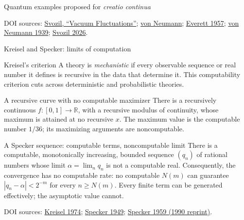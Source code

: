 \documentclass{beamer}
\newcommand{\doiref}[2]{%
  \href{https://doi.org/#1}{\textcolor{blue!65!black}{#2}}}
\newcommand{\sourcefoot}[1]{%
  \par\vfill{\tiny\color{black!60}DOI sources: #1\par}}
\begin{document}
\begin{frame}[shrink=3]{Quantum examples proposed for \emph{creatio continua}}
\sourcefoot{\doiref{10.1007/978-3-319-70815-7_14}{Svozil, ``Vacuum Fluctuations''};
\doiref{10.1007/978-3-642-61409-5}{von Neumann};
\doiref{10.1103/RevModPhys.29.454}{Everett 1957};
\href{http://www.numdam.org/item/CM_1939__6__1_0/}{\textcolor{blue!65!black}{von Neumann 1939}};
\doiref{10.1007/s10701-025-00903-9}{Svozil 2026}.}
\end{frame}


\begin{frame}{Kreisel and Specker: limits of computation}
\footnotesize
\begin{block}{Kreisel's criterion}
A theory is \emph{mechanistic} if every observable sequence or real number
it defines is recursive in the data that determine it. This computability
criterion cuts across deterministic and probabilistic theories.
\end{block}

\begin{exampleblock}{A recursive curve with no computable maximizer}
There is a recursively continuous $f\colon[0,1]\to\mathbb{R}$, with a
recursive modulus of continuity, whose maximum is attained at no recursive
$x$. The maximum value is the computable number $1/36$; its maximizing
arguments are noncomputable.
\end{exampleblock}

\begin{alertblock}{A Specker sequence: computable terms, noncomputable limit}
There is a computable, monotonically increasing, bounded sequence $(q_n)$ of
rational numbers whose limit $\alpha=\lim_n q_n$ is not a computable real.
Consequently, the convergence has no computable rate: no computable $N(m)$
can guarantee $|q_n-\alpha|<2^{-m}$ for every $n\geq N(m)$. Every finite
term can be generated effectively; the asymptotic value cannot.
\end{alertblock}

\sourcefoot{\doiref{10.1007/BF00484949}{Kreisel 1974};
\doiref{10.2307/2267043}{Specker 1949};
\doiref{10.1007/978-3-0348-9259-9_12}{Specker 1959 (1990 reprint)}.}
\end{frame}
\end{document}
